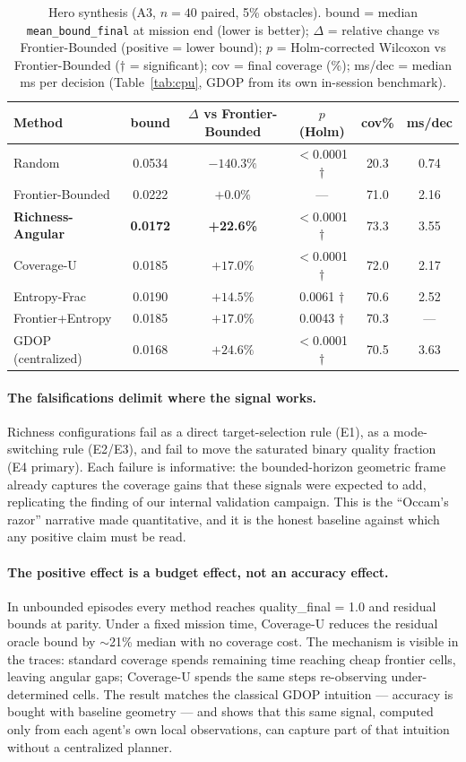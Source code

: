 \documentclass[journal]{IEEEtran}
\newcommand{\CU}{Coverage-U}
\newcommand{\FB}{Frontier-Bounded}
\begin{document}
\begin{table}[t]
\caption{Hero synthesis (A3, $n = 40$ paired, 5\% obstacles). bound = median \texttt{mean\_bound\_final} at mission end (lower is better); $\Delta$ = relative change vs \FB{} (positive = lower bound); $p$ = Holm-corrected Wilcoxon vs \FB{} ($\dagger$ = significant); cov = final coverage (\%); ms/dec = median ms per decision (Table~\ref{tab:cpu}, GDOP from its own in-session benchmark).}
\label{tab:hero}
\centering
\begin{tabular}{l c c c c c}
\toprule
Method & bound & $\Delta$ vs \FB{} & $p$ (Holm) & cov\% & ms/dec \\
\midrule
Random & 0.0534 & $-140.3\%$ & $<$0.0001 $\dagger$ & 20.3 & 0.74 \\
Frontier-Bounded & 0.0222 & $+0.0\%$ & --- & 71.0 & 2.16 \\
\textbf{Richness-Angular} & \textbf{0.0172} & \textbf{+22.6\%} & $<$0.0001 $\dagger$ & 73.3 & 3.55 \\
Coverage-U & 0.0185 & $+17.0\%$ & $<$0.0001 $\dagger$ & 72.0 & 2.17 \\
Entropy-Frac & 0.0190 & $+14.5\%$ & 0.0061 $\dagger$ & 70.6 & 2.52 \\
Frontier+Entropy & 0.0185 & $+17.0\%$ & 0.0043 $\dagger$ & 70.3 & --- \\
GDOP (centralized) & 0.0168 & $+24.6\%$ & $<$0.0001 $\dagger$ & 70.5 & 3.63 \\
\bottomrule
\end{tabular}
\end{table}

\paragraph{The falsifications delimit where the signal works.}
Richness configurations fail as a direct target-selection rule (E1), as a
mode-switching rule (E2/E3), and fail to move the saturated binary quality
fraction (E4 primary). Each failure is informative: the bounded-horizon
geometric frame already captures the coverage gains that these signals were
expected to add, replicating the finding of our internal validation campaign.
This is the ``Occam's razor'' narrative made quantitative, and it is the honest
baseline against which any positive claim must be read.

\paragraph{The positive effect is a budget effect, not an accuracy effect.}
In unbounded episodes every method reaches quality\_final = 1.0 and residual
bounds at parity. Under a fixed mission time, \CU{} reduces the residual oracle
bound by $\sim$21\% median with no coverage cost. The mechanism is visible in
the traces: standard coverage spends remaining time reaching cheap frontier
cells, leaving angular gaps; \CU{} spends the same steps re-observing
under-determined cells. The result matches the classical GDOP intuition
\cite{Bishop2004, Bishop2009} --- accuracy is bought with baseline geometry ---
and shows that this same signal, computed only from each agent's own local
observations, can capture part of that intuition without a centralized
planner.
\end{document}
